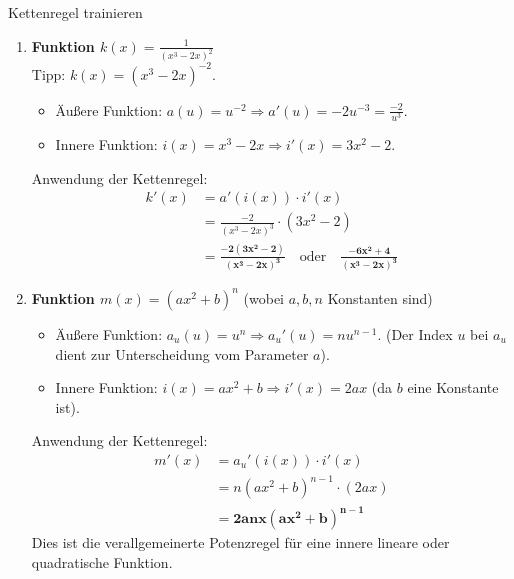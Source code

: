 \begin{loesungsumgebung}{Kettenregel trainieren}
\begin{enumerate}[label=(\alph*)]
    \item \textbf{Funktion $k(x) = \frac{1}{(x^3-2x)^2}$} \\
    Tipp: $k(x) = (x^3-2x)^{-2}$.
    \begin{itemize}
        \item Äußere Funktion: $a(u) = u^{-2} \Rightarrow a'(u) = -2u^{-3} = \frac{-2}{u^3}$.
        \item Innere Funktion: $i(x) = x^3-2x \Rightarrow i'(x) = 3x^2-2$.
    \end{itemize}
    Anwendung der Kettenregel:
    \begin{align*}
    k'(x) &= a'(i(x)) \cdot i'(x) \\
          &= \frac{-2}{(x^3-2x)^3} \cdot (3x^2-2) \\
          &= \mathbf{\frac{-2(3x^2-2)}{(x^3-2x)^3}} \quad \text{oder} \quad \mathbf{\frac{-6x^2+4}{(x^3-2x)^3}}
    \end{align*}

    \item \textbf{Funktion $m(x) = (ax^2+b)^n$} (wobei $a,b,n$ Konstanten sind)
    \begin{itemize}
        \item Äußere Funktion: $a_u(u) = u^n \Rightarrow a_u'(u) = nu^{n-1}$. (Der Index $u$ bei $a_u$ dient zur Unterscheidung vom Parameter $a$).
        \item Innere Funktion: $i(x) = ax^2+b \Rightarrow i'(x) = 2ax$ (da $b$ eine Konstante ist).
    \end{itemize}
    Anwendung der Kettenregel:
    \begin{align*}
    m'(x) &= a_u'(i(x)) \cdot i'(x) \\
           &= n(ax^2+b)^{n-1} \cdot (2ax) \\
           &= \mathbf{2anx(ax^2+b)^{n-1}}
    \end{align*}
    Dies ist die verallgemeinerte Potenzregel für eine innere lineare oder quadratische Funktion.
\end{enumerate}

\end{loesungsumgebung}




